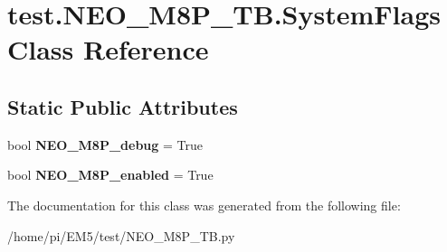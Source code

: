 \hypertarget{classtest_1_1NEO__M8P__TB_1_1SystemFlags}{}\section{test.\+N\+E\+O\+\_\+\+M8\+P\+\_\+\+T\+B.\+System\+Flags Class Reference}
\label{classtest_1_1NEO__M8P__TB_1_1SystemFlags}
\subsection*{Static Public Attributes}
\begin{DoxyCompactItemize}
\item 
\mbox{\label{classtest_1_1NEO__M8P__TB_1_1SystemFlags_a7b4d99995cae7d9dfc7616612a0ab3d9}} 
bool {\bfseries N\+E\+O\+\_\+\+M8\+P\+\_\+debug} = True
\item 
\mbox{\label{classtest_1_1NEO__M8P__TB_1_1SystemFlags_a65bc7c830e9d6dfceeb100df729f23ec}} 
bool {\bfseries N\+E\+O\+\_\+\+M8\+P\+\_\+enabled} = True
\end{DoxyCompactItemize}


The documentation for this class was generated from the following file\+:\begin{DoxyCompactItemize}
\item 
/home/pi/\+E\+M5/test/N\+E\+O\+\_\+\+M8\+P\+\_\+\+T\+B.\+py\end{DoxyCompactItemize}

